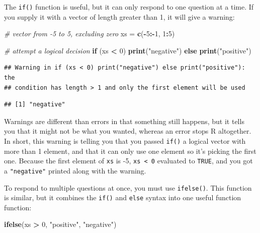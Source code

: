 \documentclass[]{book}
\newenvironment{Shaded}{\begin{snugshade}}{\end{snugshade}}
\newcommand{\CommentTok}[1]{\textcolor[rgb]{0.56,0.35,0.01}{\textit{#1}}}
\newcommand{\ControlFlowTok}[1]{\textcolor[rgb]{0.13,0.29,0.53}{\textbf{#1}}}
\newcommand{\DecValTok}[1]{\textcolor[rgb]{0.00,0.00,0.81}{#1}}
\newcommand{\KeywordTok}[1]{\textcolor[rgb]{0.13,0.29,0.53}{\textbf{#1}}}
\newcommand{\NormalTok}[1]{#1}
\newcommand{\OperatorTok}[1]{\textcolor[rgb]{0.81,0.36,0.00}{\textbf{#1}}}
\newcommand{\StringTok}[1]{\textcolor[rgb]{0.31,0.60,0.02}{#1}}
\begin{document}
The \texttt{if()} function is useful, but it can only respond to one question at a time. If you supply it with a vector of length greater than 1, it will give a warning:

\begin{Shaded}
\begin{Highlighting}[]
\CommentTok{# vector from -5 to 5, excluding zero}
\NormalTok{xs =}\StringTok{ }\KeywordTok{c}\NormalTok{(}\OperatorTok{-}\DecValTok{5}\OperatorTok{:-}\DecValTok{1}\NormalTok{, }\DecValTok{1}\OperatorTok{:}\DecValTok{5}\NormalTok{)}

\CommentTok{# attempt a logical decision}
\ControlFlowTok{if}\NormalTok{ (xs }\OperatorTok{<}\StringTok{ }\DecValTok{0}\NormalTok{) }\KeywordTok{print}\NormalTok{(}\StringTok{"negative"}\NormalTok{) }\ControlFlowTok{else} \KeywordTok{print}\NormalTok{(}\StringTok{"positive"}\NormalTok{)}
\end{Highlighting}
\end{Shaded}

\begin{verbatim}
## Warning in if (xs < 0) print("negative") else print("positive"): the
## condition has length > 1 and only the first element will be used
\end{verbatim}

\begin{verbatim}
## [1] "negative"
\end{verbatim}

Warnings are different than errors in that something still happens, but it tells you that it might not be what you wanted, whereas an error stops R altogether. In short, this warning is telling you that you passed \texttt{if()} a logical vector with more than 1 element, and that it can only use one element so it's picking the first one. Because the first element of \texttt{xs} is -5, \texttt{xs\ \textless{}\ 0} evaluated to \texttt{TRUE}, and you got a \texttt{"negative"} printed along with the warning.

To respond to multiple questions at once, you must use \texttt{ifelse()}. This function is similar, but it combines the \texttt{if()} and \texttt{else} syntax into one useful function function:

\begin{Shaded}
\begin{Highlighting}[]
\KeywordTok{ifelse}\NormalTok{(xs }\OperatorTok{>}\StringTok{ }\DecValTok{0}\NormalTok{, }\StringTok{"positive"}\NormalTok{, }\StringTok{"negative"}\NormalTok{)}
\end{Highlighting}
\end{Shaded}
\end{document}
